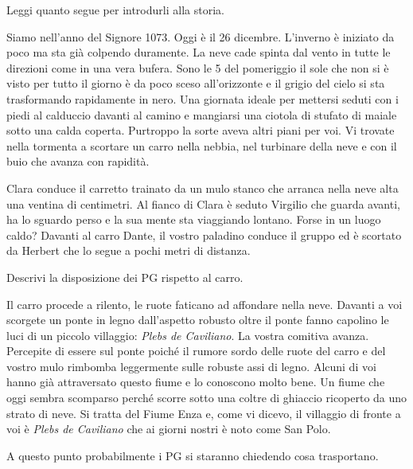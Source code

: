 \documentclass[letterpaper,twocolumn,openany,nodeprecatedcode]{dndbook}
\begin{document}
Leggi quanto segue per introdurli alla storia.

\begin{DndReadAloud}
Siamo nell'anno del Signore 1073. Oggi è il 26 dicembre. L'inverno è iniziato da poco ma sta già colpendo duramente. La neve cade spinta dal vento in tutte le direzioni come in una vera bufera. Sono le 5 del pomeriggio il sole che non si è visto per tutto il giorno è da poco sceso all'orizzonte e il grigio del cielo si sta trasformando rapidamente in nero. Una giornata ideale per mettersi seduti con i piedi al calduccio davanti al camino e mangiarsi una ciotola di stufato di maiale sotto una calda coperta. Purtroppo la sorte aveva altri piani per voi. Vi trovate nella tormenta a scortare un carro nella nebbia, nel turbinare della neve e con il buio che avanza con rapidità.

Clara conduce il carretto trainato da un mulo stanco che arranca nella neve alta una ventina di centimetri. Al fianco di Clara è seduto Virgilio che guarda avanti, ha lo sguardo perso e la sua mente sta viaggiando lontano. Forse in un luogo caldo? Davanti al carro Dante, il vostro paladino conduce il gruppo ed è scortato da Herbert che lo segue a pochi metri di distanza. 
\end{DndReadAloud}

Descrivi la disposizione dei PG rispetto al carro.

\begin{DndReadAloud}
Il carro procede a rilento, le ruote faticano ad affondare nella neve. Davanti a voi scorgete un ponte in legno dall'aspetto robusto oltre il ponte fanno capolino le luci di un piccolo villaggio: \textit{Plebs de Caviliano}. La vostra comitiva avanza. Percepite di essere sul ponte poiché il rumore sordo delle ruote del carro e del vostro mulo rimbomba leggermente sulle robuste assi di legno. Alcuni di voi hanno già attraversato questo fiume e lo conoscono molto bene. Un fiume che oggi sembra scomparso perché scorre sotto una coltre di ghiaccio ricoperto da uno strato di neve. Si tratta del Fiume Enza e, come vi dicevo, il villaggio di fronte a voi è  \textit{Plebs de Caviliano} che ai giorni nostri è noto come San Polo.
\end{DndReadAloud}

A questo punto probabilmente i PG si staranno chiedendo cosa trasportano.
\end{document}

